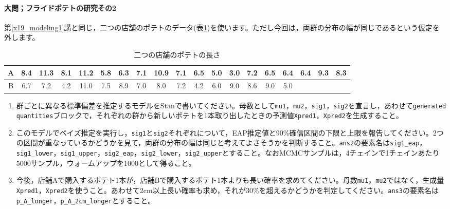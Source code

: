\documentclass{ltjsbook}
\begin{document}
\paragraph{大問；フライドポテトの研究その2}
第\ref{x19_modeling1}講と同じ，二つの店舗のポテトのデータ(表\ref{tbl:07_01})を使います。ただし今回は，両群の分布の幅が同じであるという仮定を外します。
\begin{table}[ht]
	\center
	\caption{二つの店舗のポテトの長さ}
	\begin{tabular}{c|cccccccccccccccccc}\hline
		A & 8.4 & 11.3 & 8.1 & 11.2 & 5.8 & 6.3 & 7.1 & 10.9 & 7.1 & 6.5 & 5.0 & 3.0 & 7.2 & 6.5 & 6.4 & 6.4 & 9.3 & 8.3 \\\hline
		B & 6.7 & 7.2  & 4.2 & 11.0 & 7.5 & 8.9 & 7.0 & 8.0  & 7.2 & 4.2 & 6.0 & 9.0 & 8.6 & 9.0 & 5.0 &     &     &     \\\hline
	\end{tabular}
	\label{tbl:07_01}
\end{table}
\begin{enumerate}
	\item 群ごとに異なる標準偏差を推定するモデルをStanで書いてください。母数として\verb|mu1|，\verb|mu2|，\verb|sig1|，\verb|sig2|を宣言し，あわせて\verb|generated quantities|ブロックで，それぞれの群から新しいポテトを1本取り出したときの予測値\verb|Xpred1|，\verb|Xpred2|を生成すること。
	\item このモデルでベイズ推定を実行し，\verb|sig1|と\verb|sig2|それぞれについて，EAP推定値と90\%確信区間の下限と上限を報告してください。2つの区間が重なっているかどうかを見て，両群の分布の幅は同じと考えてよさそうかを判断すること。\verb|ans2|の要素名は\verb|sig1_eap|，\verb|sig1_lower|，\verb|sig1_upper|，\verb|sig2_eap|，\verb|sig2_lower|，\verb|sig2_upper|とすること。なおMCMCサンプルは，4チェインで1チェインあたり5000サンプル，ウォームアップを1000として得ること。
	\item 今後，店舗Aで購入するポテト1本が，店舗Bで購入するポテト1本よりも長い確率を求めてください。母数\verb|mu1|，\verb|mu2|ではなく，生成量\verb|Xpred1|，\verb|Xpred2|を使うこと。あわせて2cm以上長い確率も求め，それが30\%を超えるかどうかを判定してください。\verb|ans3|の要素名は\verb|p_A_longer|，\verb|p_A_2cm_longer|とすること。
\end{enumerate}
\end{document}
